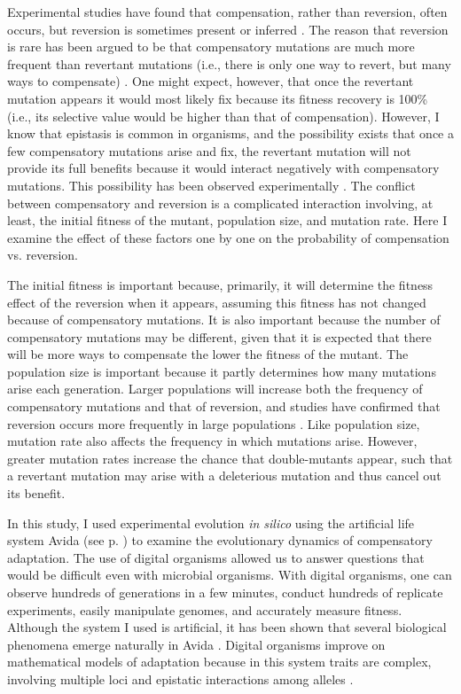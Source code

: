 \begin{doublespace}
Experimental studies have found that compensation, rather than reversion,
often occurs, but reversion is sometimes present or inferred
\citep{bur99,san05,mai02}.
%
The reason that reversion is rare has been argued to be that
compensatory mutations are much more frequent than revertant mutations
(i.e., there is only one way to revert, but many ways to compensate)
\citep{lev00,whi03,san05}.
%
One might expect, however, that once the revertant mutation appears
it would most likely fix because its fitness recovery is 100\%
(i.e., its selective value would be higher than that of compensation).
%
However, I know that epistasis is common in organisms, and the possibility
exists that once a few compensatory mutations arise and fix,
the revertant mutation will not provide its full benefits because
it would interact negatively with compensatory mutations.
%
This possibility has been observed experimentally \citep{sch97,lev00}.
%
The conflict between compensatory and reversion is a complicated
interaction involving, at least, the initial fitness of the mutant,
population size, and mutation rate.
%
Here I examine the effect of these factors one by one
on the probability of compensation vs. reversion.



The initial fitness is important because, primarily, it will determine
the fitness effect of the reversion when it appears,
assuming this fitness has not changed because of compensatory mutations.
%
It is also important because the number of compensatory mutations
may be different, given that it is expected that there will be more ways
to compensate the lower the fitness of the mutant.
%
The population size is important because it partly determines
how many mutations arise each generation.
%
Larger populations will increase both the frequency of compensatory mutations
and that of reversion, and studies have confirmed
that reversion occurs more frequently in large populations \citep{bur99}.
%
Like population size, mutation rate also affects the frequency
in which mutations arise.
%
However, greater mutation rates increase the chance that double-mutants appear,
such that a revertant mutation may arise with a deleterious mutation
and thus cancel out its benefit.



In this study, I used experimental evolution \emph{in silico}
using the artificial life system Avida \citep{ofr04}
(see p. \pageref{sec:avida})
to examine the evolutionary dynamics of compensatory adaptation.
%
The use of digital organisms allowed us to answer questions
that would be difficult even with microbial organisms.
%
With digital organisms,
one can observe hundreds of generations in a few minutes,
conduct hundreds of replicate experiments,
easily manipulate genomes,
and accurately measure fitness.
%
Although the system I used is artificial, it has been shown that
several biological phenomena emerge naturally in Avida \citep{wil02,ada06}.
%
Digital organisms improve on mathematical models of adaptation
because in this system traits are complex,
involving multiple loci and epistatic interactions among alleles \citep{len99}.




\end{doublespace}
